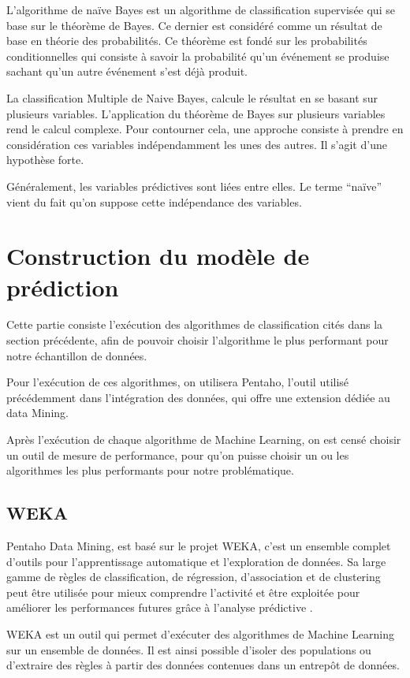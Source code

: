 L'algorithme de naïve Bayes est un algorithme de classification supervisée qui se base sur le théorème de Bayes. Ce dernier est considéré comme un résultat de base en théorie des probabilités. Ce théorème est fondé sur les probabilités conditionnelles qui consiste à savoir la probabilité qu'un événement se produise sachant qu'un autre événement s’est déjà produit.


La classification Multiple de Naive Bayes,  calcule le résultat en se basant sur plusieurs variables. L’application du théorème de Bayes sur plusieurs variables rend le calcul complexe. Pour contourner cela, une approche consiste à prendre en considération ces variables indépendamment les unes des autres. Il s’agit d’une hypothèse forte.

Généralement, les variables prédictives sont liées entre elles. Le terme “naïve” vient du fait qu’on suppose cette indépendance des variables.\cite{NB}


\section{Construction du modèle de prédiction}

Cette partie consiste l'exécution des algorithmes de classification cités dans la section précédente, afin de pouvoir choisir l'algorithme le plus performant pour notre échantillon de données. 

Pour l'exécution de ces algorithmes, on utilisera  Pentaho, l'outil utilisé précédemment dans l'intégration des données, qui offre une extension dédiée au data Mining. 

Après l'exécution de chaque algorithme de Machine Learning, on est censé choisir un outil de mesure de performance, pour qu'on puisse choisir un ou les algorithmes les plus performants pour notre problématique. 

\subsection{WEKA}

Pentaho Data Mining, est basé sur le projet WEKA, c'est un ensemble complet d'outils pour l'apprentissage automatique et l'exploration de données. Sa large gamme de règles de classification, de régression, d'association et de clustering peut être utilisée pour mieux comprendre l'activité et être exploitée pour améliorer les performances futures grâce à l'analyse prédictive \cite{10}.

WEKA est un outil qui permet d'exécuter des algorithmes de Machine Learning sur un ensemble de données. Il est ainsi possible d’isoler des populations ou d’extraire des règles à partir des données contenues dans un entrepôt de données. 

